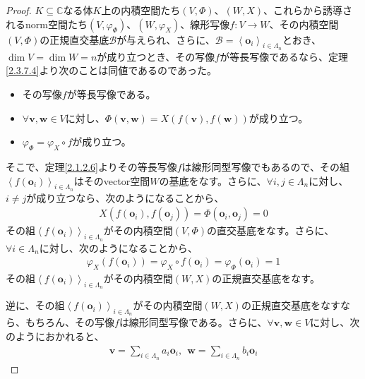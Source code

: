 \documentclass[dvipdfmx]{jsarticle}
\begin{document}
\begin{proof}
$K \subseteq \mathbb{C}$なる体$K$上の内積空間たち$(V,\varPhi )$、$(W,X)$、これらから誘導されるnorm空間たち$\left( V,\varphi_{\varPhi } \right)$、$\left( W,\varphi_{X} \right)$、線形写像$f:V \rightarrow W$、その内積空間$(V,\varPhi )$の正規直交基底$\mathcal{B}$が与えられ、さらに、$\mathcal{B} =\left\langle \mathbf{o}_{i} \right\rangle_{i \in \varLambda_{n}}$とおき、$\dim V = \dim W = n$が成り立つとき、その写像$f$が等長写像であるなら、定理\ref{2.3.7.4}より次のことは同値であるのであった。
\begin{itemize}
\item
  その写像$f$が等長写像である。
\item
  $\forall\mathbf{v},\mathbf{w} \in V$に対し、$\varPhi \left( \mathbf{v},\mathbf{w} \right) = X\left( f\left( \mathbf{v} \right),f\left( \mathbf{w} \right) \right)$が成り立つ。
\item
  $\varphi_{\varPhi } = \varphi_{X} \circ f$が成り立つ。
\end{itemize}
そこで、定理\ref{2.1.2.6}よりその等長写像$f$は線形同型写像でもあるので、その組$\left\langle f\left( \mathbf{o}_{i} \right) \right\rangle_{i \in \varLambda_{n}}$はそのvector空間$W$の基底をなす。さらに、$\forall i,j \in \varLambda_{n}$に対し、$i \neq j$が成り立つなら、次のようになることから、
\begin{align*}
X\left( f\left( \mathbf{o}_{i} \right),f\left( \mathbf{o}_{j} \right) \right) = \varPhi \left( \mathbf{o}_{i},\mathbf{o}_{j} \right) = 0
\end{align*}
その組$\left\langle f\left( \mathbf{o}_{i} \right) \right\rangle_{i \in \varLambda_{n}}$がその内積空間$(V,\varPhi )$の直交基底をなす。さらに、$\forall i \in \varLambda_{n}$に対し、次のようになることから、
\begin{align*}
\varphi_{X}\left( f\left( \mathbf{o}_{i} \right) \right) = \varphi_{X} \circ f\left( \mathbf{o}_{i} \right) = \varphi_{\varPhi }\left( \mathbf{o}_{i} \right) = 1
\end{align*}
その組$\left\langle f\left( \mathbf{o}_{i} \right) \right\rangle_{i \in \varLambda_{n}}$がその内積空間$(W,X)$の正規直交基底をなす。\par
逆に、その組$\left\langle f\left( \mathbf{o}_{i} \right) \right\rangle_{i \in \varLambda_{n}}$がその内積空間$(W,X)$の正規直交基底をなすなら、もちろん、その写像$f$は線形同型写像である。さらに、$\forall\mathbf{v},\mathbf{w} \in V$に対し、次のようにおかれると、
\begin{align*}
\mathbf{v} = \sum_{i \in \varLambda_{n}} {a_{i}\mathbf{o}_{i}},\ \ \mathbf{w} = \sum_{i \in \varLambda_{n}} {b_{i}\mathbf{o}_{i}}

\end{align*}
\end{proof}
\end{document}
